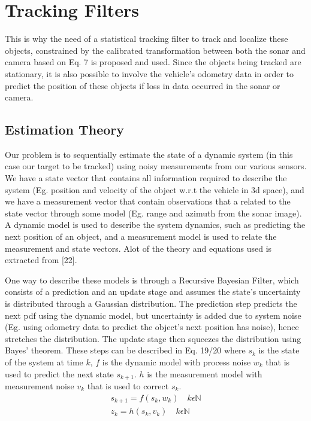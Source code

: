 \documentclass[a4paper]{IEEEtran}
\begin{document}
\section{Tracking Filters}

This is why the need of a statistical tracking filter to track and localize these objects, constrained by the calibrated transformation between both the sonar and camera based on Eq. 7 is proposed and used. Since the objects being tracked are stationary, it is also possible to involve the vehicle's odometry data in order to predict the position of these objects if loss in data occurred in the sonar or camera. 

\subsection{Estimation Theory}

Our problem is to sequentially estimate the state of a dynamic system (in this case our target to be tracked) using noisy measurements from our various sensors. We have a state vector that contains all information required to describe the system (Eg. position and velocity of the object w.r.t the vehicle in 3d space), and we have a measurement vector that contain observations that a related to the state vector through some model (Eg. range and azimuth from the sonar image). A dynamic model is used to describe the system dynamics, such as predicting the next position of an object, and a measurement model is used to relate the measurement and state vectors. Alot of the theory and equations used is extracted from [22].

One way to describe these models is through a Recursive Bayesian Filter, which consists of a prediction and an update stage and assumes the state's uncertainty is distributed through a Gaussian distribution. The prediction step predicts the next pdf using the dynamic model, but uncertainty is added due to system noise (Eg. using odometry data to predict the object's next position has noise), hence stretches the distribution. The update stage then squeezes the distribution using Bayes' theorem. These steps can be described in Eq. 19/20 where $s_{k}$ is the state of the system at time $k$, $f$ is the dynamic model with process noise $w_{k}$ that is used to predict the next state $s_{k+1}$. $h$ is the measurement model with measurement noise $v_{k}$ that is used to correct $s_{k}$.
\begingroup\makeatletter\def\f@size{7}\check@mathfonts
\begin{gather}
s_{k+1}=f(s_{k},w_{k})\quad k\epsilon\mathbb{N} \\
z_{k}=h(s_{k},v_{k})\quad k\epsilon\mathbb{N}
\end{gather}
\endgroup
\end{document}
